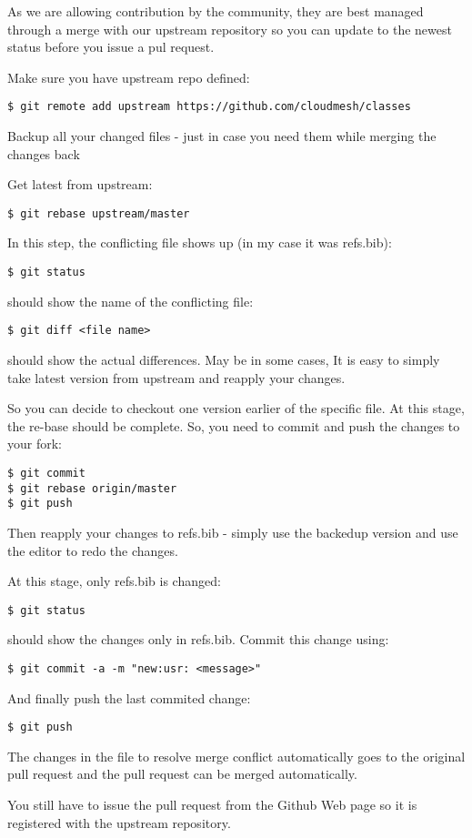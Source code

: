 As we are allowing contribution by the community, they are best managed
through a merge with our upstream repository so you can update to the
newest status before you issue a pul request.

Make sure you have upstream repo defined:

\begin{verbatim}
$ git remote add upstream https://github.com/cloudmesh/classes
\end{verbatim}

Backup all your changed files - just in case you need them while merging
the changes back

Get latest from upstream:

\begin{verbatim}
$ git rebase upstream/master
\end{verbatim}

In this step, the conflicting file shows up (in my case it was
refs.bib):

\begin{verbatim}
$ git status
\end{verbatim}

should show the name of the conflicting file:

\begin{verbatim}
$ git diff <file name>
\end{verbatim}

should show the actual differences. May be in some cases, It is easy to
simply take latest version from upstream and reapply your changes.

So you can decide to checkout one version earlier of the specific file.
At this stage, the re-base should be complete. So, you need to commit
and push the changes to your fork:

\begin{verbatim}
$ git commit
$ git rebase origin/master
$ git push
\end{verbatim}

Then reapply your changes to refs.bib - simply use the backedup version
and use the editor to redo the changes.

At this stage, only refs.bib is changed:

\begin{verbatim}
$ git status
\end{verbatim}

should show the changes only in refs.bib. Commit this change using:

\begin{verbatim}
$ git commit -a -m "new:usr: <message>"
\end{verbatim}

And finally push the last commited change:

\begin{verbatim}
$ git push
\end{verbatim}

The changes in the file to resolve merge conflict automatically goes to
the original pull request and the pull request can be merged
automatically.

You still have to issue the pull request from the Github Web page so it
is registered with the upstream repository.
